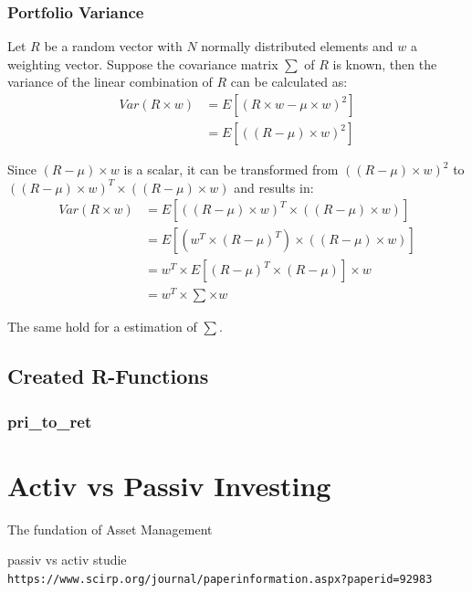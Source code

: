 \documentclass[
  oneside]{book}
\begin{document}
\hypertarget{portfolio-variance}{%
\subsection{Portfolio Variance}\label{portfolio-variance}}

Let \(R\) be a random vector with \(N\) normally distributed elements and \(w\) a weighting vector. Suppose the covariance matrix \(\sum\) of \(R\) is known, then the variance of the linear combination of \(R\) can be calculated as:
\begin{align*}
  Var(R \times w) &= E[(R \times w - \mu \times w)^2] \\
  &= E[((R - \mu) \times w)^2]
\end{align*}

Since \((R - \mu) \times w\) is a scalar, it can be transformed from \(((R - \mu) \times w)^2\) to \(((R - \mu) \times w)^T \times ((R - \mu) \times w)\) and results in:
\begin{align*}
  Var(R \times w) &= E[((R - \mu) \times w)^T \times ((R - \mu) \times w)]\\ 
  &= E[(w^T \times (R - \mu)^T) \times ((R - \mu) \times w)]\\ 
  &= w^T \times E[(R - \mu)^T \times (R - \mu)] \times w \\
  &= w^T \times \sum \times w
\end{align*}

The same hold for a estimation of \(\sum\).

\hypertarget{created-r-functions}{%
\section{Created R-Functions}\label{created-r-functions}}

\hypertarget{pri_to_ret}{%
\subsection{pri\_to\_ret}\label{pri_to_ret}}

\hypertarget{activ-vs-passiv-investing}{%
\chapter{Activ vs Passiv Investing}\label{activ-vs-passiv-investing}}

The fundation of Asset Management

passiv vs activ studie
\texttt{https://www.scirp.org/journal/paperinformation.aspx?paperid=92983}
\end{document}

